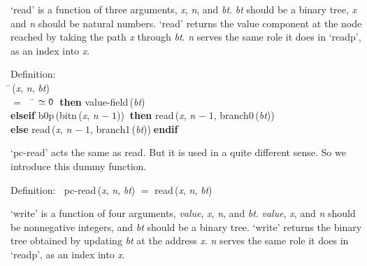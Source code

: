  `read' is a function of three arguments, {\it{x\/}}, {\it{n\/}}, and {\it{bt\/}}.  {\it{bt\/}} should be
 a binary tree, {\it{x\/}} and {\it{n\/}} should be natural numbers.  `read' returns the
 value component at the node reached by taking the path {\it{x\/}} through {\it{bt\/}}. {\it{n\/}}
 serves the same role it does in `readp', as an index into {\it{x\/}}.

\begin{tabbing}{\sc Definition}: \\  
\=\,({\it{x\/}}, {\it{n\/}}, {\it{bt\/}}) \\ 
$=$$\;\;\;\;$\= $\simeq {\tt{0}}$$\;\;${\bf then }{\rm{value-field}}\,({\it{bt\/}}) \\ 
{\bf elseif }{\rm{b0p}}\,({\rm{bitn}}\,({\it{x\/}}, {\it{n\/}} $-\;1$))$\;\;${\bf then }{\rm{read}}\,({\it{x\/}}, {\it{n\/}} $-\;1$, {\rm{branch0}}\,({\it{bt\/}})) \\ 
{\bf else }{\rm{read}}\,({\it{x\/}}, {\it{n\/}} $-\;1$, {\rm{branch1}}\,({\it{bt\/}}))$\;${\bf  endif}\-\-
\end{tabbing}

 `pc-read' acts the same as read. But it is used in a  quite different
 sense.  So we introduce this dummy function.
\begin{tabbing}{\sc Definition}:$\;\;$
{\rm{pc-read}}\,({\it{x\/}}, {\it{n\/}}, {\it{bt\/}}) $=$ {\rm{read}}\,({\it{x\/}}, {\it{n\/}}, {\it{bt\/}})
\end{tabbing}

 `write' is a function of four arguments, {\it{value\/}}, {\it{x\/}}, {\it{n\/}}, and {\it{bt\/}}.
 {\it{value\/}}, {\it{x\/}}, and {\it{n\/}} should be nonnegative integers, and {\it{bt\/}} should be a
 binary tree.  `write' returns the binary tree obtained by updating {\it{bt\/}} at
 the address {\it{x\/}}.  {\it{n\/}} serves the same role it does in `readp', as an index
 into {\it{x\/}}.


